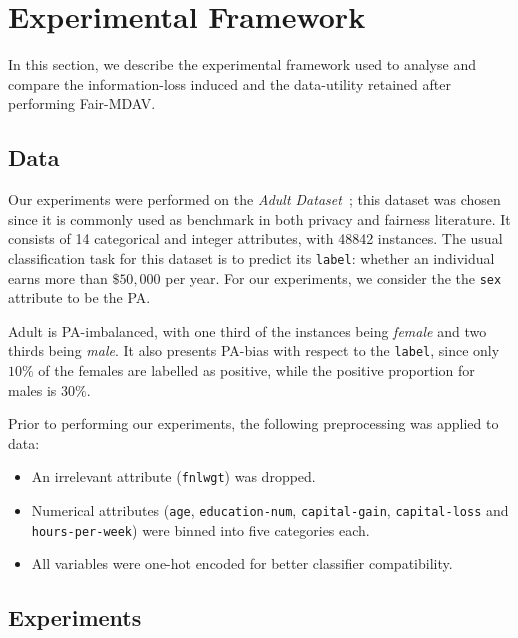 \section{Experimental Framework}
\label{sec:experiments}

In this section, we describe the experimental framework used to analyse and compare the information-loss induced and the data-utility retained after performing Fair-MDAV. 

\subsection{Data}
\label{subsec:datasets}

Our experiments were performed on the \emph{Adult Dataset}~\cite{Dua2019}; this dataset was chosen since it is commonly used as benchmark in both privacy and fairness literature. It consists of 14 categorical and integer attributes, with 48842 instances. The usual classification task for this dataset is to predict its \texttt{label}: whether an individual earns more than $\$50,000$ per year. For our experiments, we consider the the \texttt{sex} attribute to be the PA.

Adult is PA-imbalanced, with one third of the instances being \emph{female} and two thirds being \emph{male}. It also presents PA-bias with respect to the \texttt{label}, since only $10\%$ of the females are labelled as positive, while the positive proportion for males is $30\%$.

Prior to performing our experiments, the following preprocessing was applied to data:
\begin{itemize}
  \item An irrelevant attribute (\texttt{fnlwgt}) was dropped.
  \item Numerical attributes (\texttt{age}, \texttt{education-num}, \texttt{capital-gain}, \texttt{capital-loss} and \texttt{hours-per-week}) were binned into five categories each.
  \item All variables were one-hot encoded for better classifier compatibility.
\end{itemize}

\subsection{Experiments}
\label{subsec:experiments}

